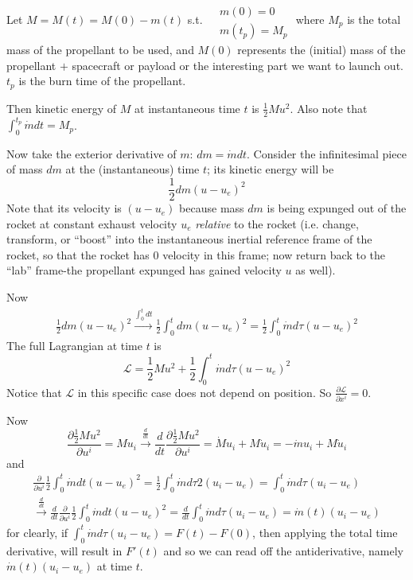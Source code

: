 \documentclass[10pt]{amsart}
\begin{document}
\begin{multicols*}{2}
Let $M = M(t) = M(0) - m(t)$ s.t. $\begin{aligned} & \quad \\
  & m(0) = 0 \\
  & m(t_p) = M_p \end{aligned}$ where $M_p$ is the total mass of the propellant to be used, and $M(0)$ represents the (initial) mass of the propellant $+$ spacecraft or payload or the interesting part we want to launch out.  $t_p$ is the burn time of the propellant.  

Then kinetic energy of $M$ at instantaneous time $t$ is $\frac{1}{2} Mu^2$.  Also note that $\int_0^{t_p} \dot{m} dt = M_p$.  

Now take the exterior derivative of $m$: $dm = \dot{m}dt$.  Consider the infinitesimal piece of mass $dm$ at the (instantaneous) time $t$; its kinetic energy will be 
\[
\frac{1}{2} dm(u-u_e)^2
\]
Note that its velocity is $(u-u_e)$ because mass $dm$ is being expunged out of the rocket at constant exhaust velocity $u_e$ \emph{relative} to the rocket (i.e. change, transform, or ``boost'' into the instantaneous inertial reference frame of the rocket, so that the rocket has $0$ velocity in this frame; now return back to the ``lab'' frame-the propellant expunged has gained velocity $u$ as well).  

Now
\[
\begin{gathered}
  \frac{1}{2} dm (u-u_e)^2 \xrightarrow{ \int_0^t dt } \frac{1}{2} \int_0^t dm(u-u_e)^2 = \frac{1}{2} \int_0^t \dot{m} d\tau (u-u_e)^2
\end{gathered}
\]
The full Lagrangian at time $t$ is 
\[
\mathcal{L} = \frac{1}{2} M u^2 + \frac{1}{2} \int_0^t \dot{m} d\tau (u-u_e)^2
\]
Notice that $\mathcal{L}$ in this specific case does not depend on position.  So $\frac{ \partial \mathcal{L}}{\partial x^i} =0$.  

Now
\[
\frac{ \partial \frac{1}{2} M u^2 }{ \partial u^i} = Mu_i \xrightarrow{ \frac{d}{dt} } \frac{d}{dt} \frac{ \partial \frac{1}{2} M u^2 }{ \partial u^i }  = \dot{M} u_i + M\dot{u}_i = -\dot{m} u_i + M \dot{u}_i
\]
and
\[
\begin{gathered}
\frac{ \partial }{ \partial u^i} \frac{1}{2} \int_0^t \dot{m} dt (u-u_e)^2 = \frac{1}{2} \int_0^t \dot{m} d\tau 2(u_i-u_e) = \int_0^t \dot{m} d\tau (u_i - u_e) \\
\xrightarrow{ \frac{d}{dt} } \frac{d}{dt} \frac{ \partial }{ \partial u^i} \frac{1}{2} \int_0^t \dot{m} dt (u-u_e)^2 = \frac{d}{dt} \int_0^t \dot{m} d\tau (u_i - u_e) = \dot{m}(t) (u_i - u_e)
\end{gathered}
\]
for clearly, if $\int_0^t \dot{m} d\tau (u_i - u_e) = F(t) - F(0)$, then applying the total time derivative, will result in $F'(t)$ and so we can read off the antiderivative, namely $\dot{m}(t)(u_i-u_e)$ at time $t$.  


\end{multicols*}
\end{document}
